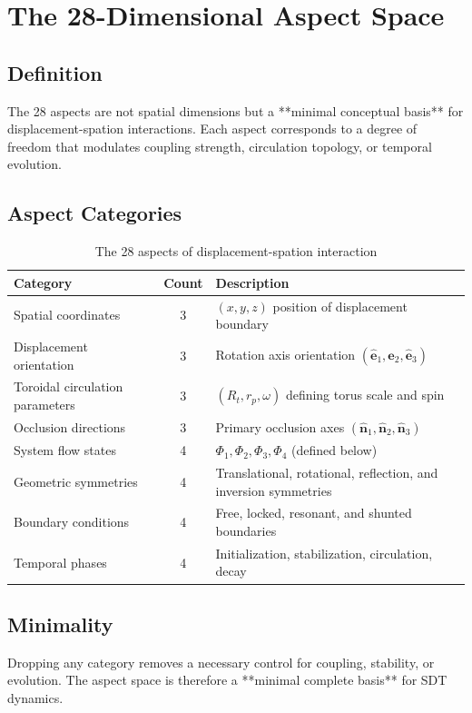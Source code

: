 \section{The 28-Dimensional Aspect Space}

\subsection{Definition}
The 28 aspects are not spatial dimensions but a **minimal conceptual basis** for displacement-spation interactions. Each aspect corresponds to a degree of freedom that modulates coupling strength, circulation topology, or temporal evolution.

\subsection{Aspect Categories}
\begin{table}[h]
\centering
\begin{tabular}{|l|c|p{9cm}|}
\hline
\textbf{Category} & \textbf{Count} & \textbf{Description} \\
\hline
Spatial coordinates & 3 & $(x, y, z)$ position of displacement boundary \\
Displacement orientation & 3 & Rotation axis orientation $(\hat{\mathbf{e}}_1, \hat{\mathbf{e}}_2, \hat{\mathbf{e}}_3)$ \\
Toroidal circulation parameters & 3 & $(R_t, r_p, \omega)$ defining torus scale and spin \\
Occlusion directions & 3 & Primary occlusion axes $(\hat{\mathbf{n}}_1, \hat{\mathbf{n}}_2, \hat{\mathbf{n}}_3)$ \\
System flow states & 4 & $\Phi_1, \Phi_2, \Phi_3, \Phi_4$ (defined below) \\
Geometric symmetries & 4 & Translational, rotational, reflection, and inversion symmetries \\
Boundary conditions & 4 & Free, locked, resonant, and shunted boundaries \\
Temporal phases & 4 & Initialization, stabilization, circulation, decay \\
\hline
\end{tabular}
\caption{The 28 aspects of displacement-spation interaction}
\end{table}

\subsection{Minimality}
Dropping any category removes a necessary control for coupling, stability, or evolution. The aspect space is therefore a **minimal complete basis** for SDT dynamics.

